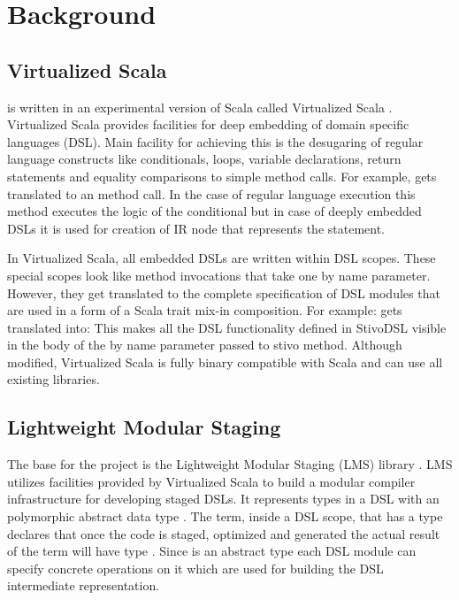 \section{Background}
\label{sec:background}

\subsection{Virtualized Scala}
\label{subsec:virtualized-scala}
\tool is written in an experimental version of Scala called Virtualized Scala \cite{sv}. Virtualized Scala provides facilities for deep embedding of domain specific languages (DSL). Main facility for achieving this is the desugaring of regular language constructs like conditionals, loops, variable declarations, return statements and equality comparisons to simple method calls. For example,  gets translated to an  method call. In the case of regular language execution this method executes the logic of the conditional but in case of deeply embedded DSLs it is used for creation of  IR node that represents the  statement.  

In Virtualized Scala, all embedded DSLs are written within DSL scopes. These special scopes look like method invocations that take one by name parameter. However, they get translated to the complete specification of DSL modules that are used in a form of a Scala trait mix-in composition. For example: 
 gets translated into:
This makes all the DSL functionality defined in StivoDSL visible in the body of the by name parameter passed to stivo method. 
Although modified, Virtualized Scala is fully binary compatible with Scala and can use all existing libraries.  


\subsection{Lightweight Modular Staging}
\label{subsec:lightweight-modular-staging}

The base for the \tool project is the Lightweight Modular Staging (LMS) library \cite{rompf_lightweight_2010}. LMS utilizes facilities provided by Virtualized Scala to build a modular compiler infrastructure for developing staged DSLs. It represents types in a DSL with an polymorphic abstract data type . The term, inside a DSL scope, that has a type  declares that once the code is staged, optimized and generated the actual result of the term will have type .  Since  is an abstract type each DSL module can specify concrete operations on it which are used for building the DSL intermediate representation. 

